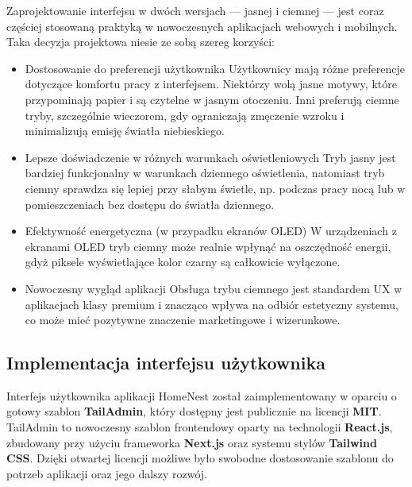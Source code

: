 Zaprojektowanie interfejsu w dwóch wersjach — jasnej i ciemnej — jest coraz częściej stosowaną praktyką w nowoczesnych aplikacjach webowych i mobilnych. Taka decyzja projektowa niesie ze sobą szereg korzyści:
\begin{itemize}
  \item Dostosowanie do preferencji użytkownika
  Użytkownicy mają różne preferencje dotyczące komfortu pracy z interfejsem. Niektórzy wolą jasne motywy, które przypominają papier i są czytelne w jasnym otoczeniu. Inni preferują ciemne tryby, szczególnie wieczorem, gdy ograniczają zmęczenie wzroku i minimalizują emisję światła niebieskiego.
  \item Lepsze doświadczenie w różnych warunkach oświetleniowych
  Tryb jasny jest bardziej funkcjonalny w warunkach dziennego oświetlenia, natomiast tryb ciemny sprawdza się lepiej przy słabym świetle, np. podczas pracy nocą lub w pomieszczeniach bez dostępu do światła dziennego.
  \item Efektywność energetyczna (w przypadku ekranów OLED)
  W urządzeniach z ekranami OLED tryb ciemny może realnie wpłynąć na oszczędność energii, gdyż piksele wyświetlające kolor czarny są całkowicie wyłączone.
  \item Nowoczesny wygląd aplikacji
  Obsługa trybu ciemnego jest standardem UX w aplikacjach klasy premium i znacząco wpływa na odbiór estetyczny systemu, co może mieć pozytywne znaczenie marketingowe i wizerunkowe.
\end{itemize}


\subsection{Implementacja interfejsu użytkownika}

Interfejs użytkownika aplikacji HomeNest został zaimplementowany w oparciu o gotowy szablon \textbf{TailAdmin}, który dostępny jest publicznie na licencji \textbf{MIT}. TailAdmin to nowoczesny szablon frontendowy oparty na technologii \textbf{React.js}, zbudowany przy użyciu frameworka \textbf{Next.js} oraz systemu stylów \textbf{Tailwind CSS}. Dzięki otwartej licencji możliwe było swobodne dostosowanie szablonu do potrzeb aplikacji oraz jego dalszy rozwój.

